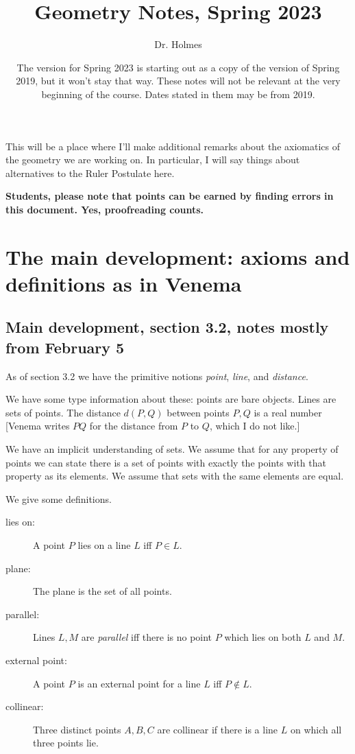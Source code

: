 \documentclass[12pt]{article}
\title{Geometry Notes, Spring 2023}
\author{Dr. Holmes}
\date{The version for Spring 2023 is starting out as a copy of the version of Spring 2019, but it won't stay that way.  These notes will not be relevant at the very beginning of the course.  Dates stated in them may be from 2019.}
\begin{document}
\maketitle

\tableofcontents
\vspace{.125 in}

This will be a place where I'll make additional remarks about the axiomatics of the geometry we are working on.  In particular, I will say things about alternatives to the Ruler Postulate here.

{\bf Students, please note that points can be earned by finding errors in this document.  Yes, proofreading counts.}

\section{The main development:  axioms and definitions as in Venema}

\subsection{Main development, section 3.2, notes mostly from February 5}

As of section 3.2 we have the primitive notions {\em point\/}, {\em line\/}, and {\em distance\/}.

We have some type information about these:  points are bare objects.  Lines are sets of points.  The distance $d(P,Q)$ between points $P,Q$ is a real number [Venema writes $PQ$ for the distance from $P$ to $Q$, which I do  not like.]



We have an implicit understanding of sets.  We assume that for any property of points we can state there is a set of points with exactly the points with that property as its elements.
We assume that sets with the same elements are equal.

We give some definitions.

\begin{description}

\item[lies on:]  A point $P$ lies on a line $L$ iff $P \in L$.

\item[plane:]  The plane is the set of all points.

\item[parallel:]  Lines $L,M$ are {\em parallel\/} iff there is no point $P$ which lies on both $L$ and $M$.

\item[external point:]  A point $P$ is an external point for a line $L$ iff $P \not\in L$.

\item[collinear:]  Three distinct points $A,B,C$ are collinear if there is a line $L$ on which all three points lie.


\end{description}
\end{document}
